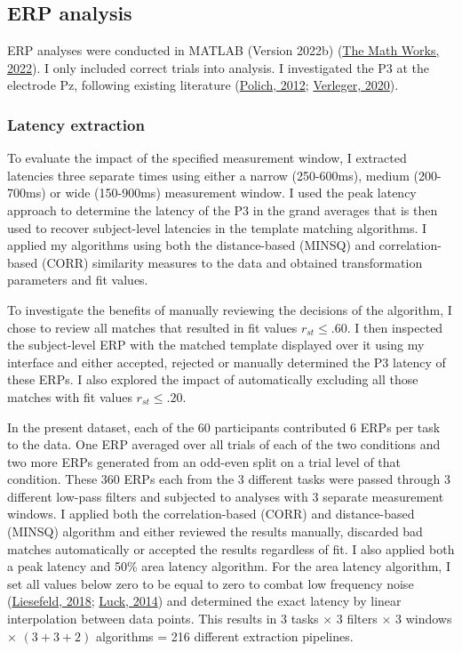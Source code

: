 \documentclass[
  man]{apa7}
\begin{document}
\hypertarget{erp-analysis}{%
\subsection{ERP analysis}\label{erp-analysis}}

ERP analyses were conducted in MATLAB (Version 2022b) (\protect\hyperlink{ref-matlab2022b}{The Math Works, 2022}). I only included correct trials into analysis. I investigated the P3 at the electrode Pz, following existing literature (\protect\hyperlink{ref-polich2012neuropsychology}{Polich, 2012}; \protect\hyperlink{ref-verleger2020effects}{Verleger, 2020}).

\hypertarget{latency-extraction}{%
\subsubsection{Latency extraction}\label{latency-extraction}}

To evaluate the impact of the specified measurement window, I extracted latencies three separate times using either a narrow (250-600ms), medium (200-700ms) or wide (150-900ms) measurement window. I used the peak latency approach to determine the latency of the P3 in the grand averages that is then used to recover subject-level latencies in the template matching algorithms. I applied my algorithms using both the distance-based (MINSQ) and correlation-based (CORR) similarity measures to the data and obtained transformation parameters and fit values.

To investigate the benefits of manually reviewing the decisions of the algorithm, I chose to review all matches that resulted in fit values \(r_{st} \le .60\). I then inspected the subject-level ERP with the matched template displayed over it using my interface and either accepted, rejected or manually determined the P3 latency of these ERPs.
I also explored the impact of automatically excluding all those matches with fit values \(r_{st} \le .20\).

In the present dataset, each of the 60 participants contributed 6 ERPs per task to the data. One ERP averaged over all trials of each of the two conditions and two more ERPs generated from an odd-even split on a trial level of that condition. These 360 ERPs each from the 3 different tasks were passed through 3 different low-pass filters and subjected to analyses with 3 separate measurement windows. I applied both the correlation-based (CORR) and distance-based (MINSQ) algorithm and either reviewed the results manually, discarded bad matches automatically or accepted the results regardless of fit. I also applied both a peak latency and 50\% area latency algorithm. For the area latency algorithm, I set all values below zero to be equal to zero to combat low frequency noise (\protect\hyperlink{ref-liesefeld2018estimating}{Liesefeld, 2018}; \protect\hyperlink{ref-luck2014introduction}{Luck, 2014}) and determined the exact latency by linear interpolation between data points. This results in 3 tasks \(\times\) 3 filters \(\times\) 3 windows \(\times\) \((3 + 3 + 2)\) algorithms = 216 different extraction pipelines.
\end{document}
